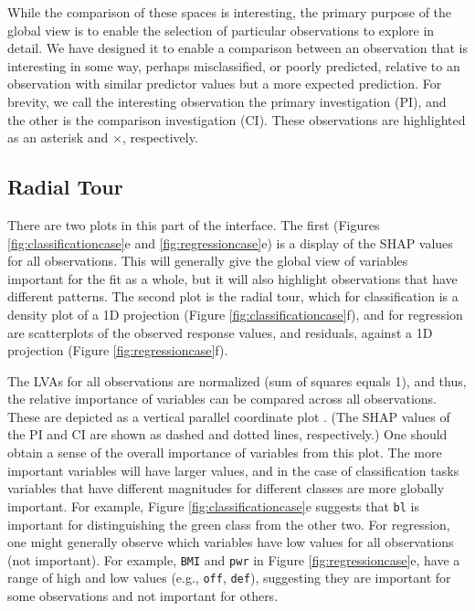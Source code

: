 \documentclass[
]{jss}
\begin{document}
While the comparison of these spaces is interesting, the primary purpose
of the global view is to enable the selection of particular observations
to explore in detail. We have designed it to enable a comparison between
an observation that is interesting in some way, perhaps misclassified,
or poorly predicted, relative to an observation with similar predictor
values but a more expected prediction. For brevity, we call the
interesting observation the primary investigation (PI), and the other is
the comparison investigation (CI). These observations are highlighted as
an asterisk and \(\times\), respectively.

\hypertarget{radial-tour}{%
\subsection{Radial Tour}\label{radial-tour}}

There are two plots in this part of the interface. The first (Figures
\ref{fig:classificationcase}e and \ref{fig:regressioncase}e) is a
display of the SHAP values for all observations. This will generally
give the global view of variables important for the fit as a whole, but
it will also highlight observations that have different patterns. The
second plot is the radial tour, which for classification is a density
plot of a 1D projection (Figure \ref{fig:classificationcase}f), and for
regression are scatterplots of the observed response values, and
residuals, against a 1D projection (Figure \ref{fig:regressioncase}f).

The LVAs for all observations are normalized (sum of squares equals 1),
and thus, the relative importance of variables can be compared across
all observations. These are depicted as a vertical parallel coordinate
plot \citep{ocagne_coordonnees_1885}. (The SHAP values of the PI and CI
are shown as dashed and dotted lines, respectively.) One should obtain a
sense of the overall importance of variables from this plot. The more
important variables will have larger values, and in the case of
classification tasks variables that have different magnitudes for
different classes are more globally important. For example, Figure
\ref{fig:classificationcase}e suggests that \texttt{bl} is important for
distinguishing the green class from the other two. For regression, one
might generally observe which variables have low values for all
observations (not important). For example, \texttt{BMI} and \texttt{pwr}
in Figure \ref{fig:regressioncase}e, have a range of high and low values
(e.g., \texttt{off}, \texttt{def}), suggesting they are important for
some observations and not important for others.
\end{document}
